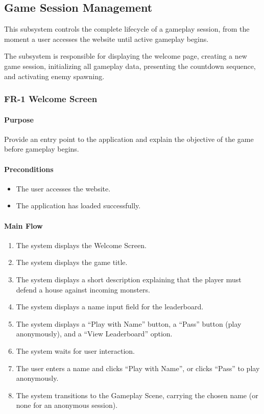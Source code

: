 \documentclass[11pt,a4paper]{article}
\begin{document}
\subsection{Game Session Management}

This subsystem controls the complete lifecycle of a gameplay session, from the
moment a user accesses the website until active gameplay begins.

The subsystem is responsible for displaying the welcome page, creating a new game
session, initializing all gameplay data, presenting the countdown sequence, and
activating enemy spawning.

\subsubsection{FR-1 Welcome Screen}

\paragraph{Purpose}
Provide an entry point to the application and explain the objective of the game
before gameplay begins.

\paragraph{Preconditions}
\begin{itemize}
  \item The user accesses the website.
  \item The application has loaded successfully.
\end{itemize}

\paragraph{Main Flow}
\begin{enumerate}
  \item The system displays the Welcome Screen.
  \item The system displays the game title.
  \item The system displays a short description explaining that the player must
        defend a house against incoming monsters.
  \item The system displays a name input field for the leaderboard.
  \item The system displays a ``Play with Name'' button, a ``Pass'' button (play
        anonymously), and a ``View Leaderboard'' option.
  \item The system waits for user interaction.
  \item The user enters a name and clicks ``Play with Name'', or clicks ``Pass''
        to play anonymously.
  \item The system transitions to the Gameplay Scene, carrying the chosen name
        (or none for an anonymous session).
\end{enumerate}
\end{document}
